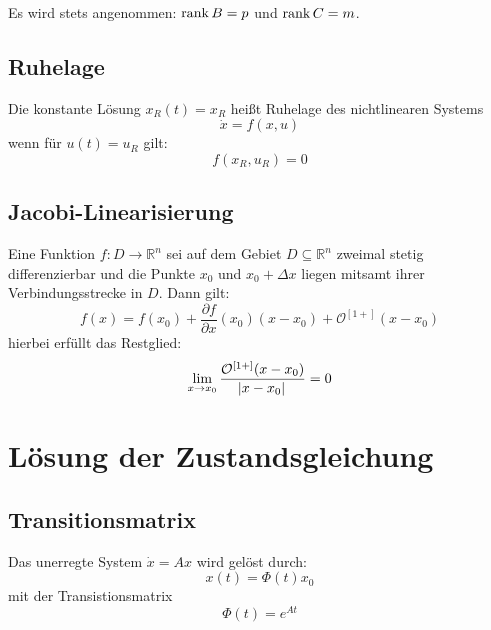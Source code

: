 Es wird stets angenommen: $\operatorname*{rank}{B} =p$ und $\operatorname*{rank}{C}=m$.

\subsection{Ruhelage}
Die konstante Lösung $x_R(t) =x_R$ heißt Ruhelage des nichtlinearen Systems
\begin{equation}
    \dot{x} = f(x,u)
\end{equation}
wenn für $u(t) = u_R$ gilt:
\begin{equation}
    f(x_R, u_R) = 0
\end{equation}

\subsection{Jacobi-Linearisierung}
Eine Funktion $f: D \to \mathbb{R}^n$ sei auf dem Gebiet $D \subseteq \mathbb{R}^n$
zweimal stetig differenzierbar und die Punkte $x_0$ und $x_0 + \Delta x$ liegen mitsamt
ihrer Verbindungsstrecke in $D$. Dann gilt:
\begin{equation}
    f(x) = f(x_0) + \frac{\partial f}{\partial x}(x_0) (x-x_0) + \mathcal{O}^{[1+]}
        (x-x_0)
\end{equation}
hierbei erfüllt das Restglied:
\begin{equation}
    \lim_{x\to x_0} \frac{\mathcal{O}^{[1+]}(x-x_0)}{\abs{x-x_0}} = 0
\end{equation}

\section{Lösung der Zustandsgleichung}
\subsection{Transitionsmatrix}
Das unerregte System $\dot{x} = Ax$ wird gelöst durch:
\begin{equation}
    x(t) = \Phi(t) x_0
\end{equation}
mit der Transistionsmatrix
\begin{equation}
    \Phi(t) = e^{At}
\end{equation}

